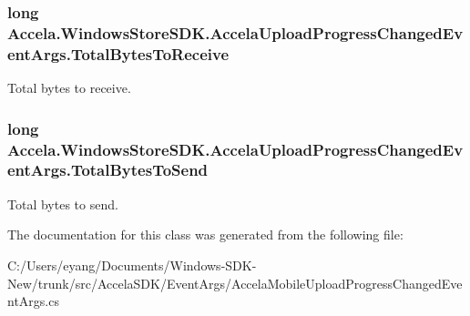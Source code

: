 \hypertarget{class_accela_1_1_windows_store_s_d_k_1_1_accela_upload_progress_changed_event_args_a787b7c1b7dec1736e51dfe473563400c}{
\subsubsection[{Total\+Bytes\+To\+Receive}]{\setlength{\rightskip}{0pt plus 5cm}long Accela.\+Windows\+Store\+S\+D\+K.\+Accela\+Upload\+Progress\+Changed\+Event\+Args.\+Total\+Bytes\+To\+Receive\hspace{0.3cm}{\ttfamily [get]}}}\label{class_accela_1_1_windows_store_s_d_k_1_1_accela_upload_progress_changed_event_args_a787b7c1b7dec1736e51dfe473563400c}


Total bytes to receive. 

\hypertarget{class_accela_1_1_windows_store_s_d_k_1_1_accela_upload_progress_changed_event_args_abc0c15f686481e729f7bd11bcc1c00bf}{
\subsubsection[{Total\+Bytes\+To\+Send}]{\setlength{\rightskip}{0pt plus 5cm}long Accela.\+Windows\+Store\+S\+D\+K.\+Accela\+Upload\+Progress\+Changed\+Event\+Args.\+Total\+Bytes\+To\+Send\hspace{0.3cm}{\ttfamily [get]}}}\label{class_accela_1_1_windows_store_s_d_k_1_1_accela_upload_progress_changed_event_args_abc0c15f686481e729f7bd11bcc1c00bf}


Total bytes to send. 



The documentation for this class was generated from the following file\+:\begin{DoxyCompactItemize}
\item 
C\+:/\+Users/eyang/\+Documents/\+Windows-\/\+S\+D\+K-\/\+New/trunk/src/\+Accela\+S\+D\+K/\+Event\+Args/Accela\+Mobile\+Upload\+Progress\+Changed\+Event\+Args.\+cs\end{DoxyCompactItemize}
